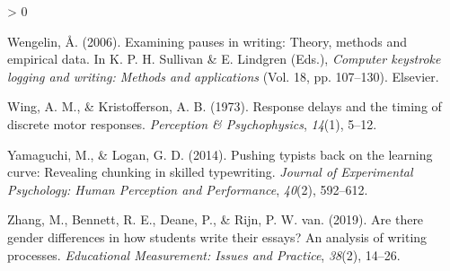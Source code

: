 \documentclass[
  english,
  man,mask,floatsintext]{apa7}
\newlength{\cslhangindent}
\newenvironment{CSLReferences}[2] %
 {%
  \setlength{\parindent}{0pt}
  \ifodd #1 \everypar{\setlength{\hangindent}{\cslhangindent}}\ignorespaces\fi
  \ifnum #2 > 0
  \setlength{\parskip}{#2\baselineskip}
  \fi
 }%
 {}
\begin{document}
\begin{CSLReferences}{1}{0}
\leavevmode\hypertarget{ref-wen06}{}%
Wengelin, Å. (2006). Examining pauses in writing: {T}heory, methods and empirical data. In K. P. H. Sullivan \& E. Lindgren (Eds.), \emph{Computer keystroke logging and writing: Methods and applications} (Vol. 18, pp. 107--130). Elsevier.

\leavevmode\hypertarget{ref-wing1973response}{}%
Wing, A. M., \& Kristofferson, A. B. (1973). Response delays and the timing of discrete motor responses. \emph{Perception \& Psychophysics}, \emph{14}(1), 5--12.

\leavevmode\hypertarget{ref-yamaguchi2014pushing}{}%
Yamaguchi, M., \& Logan, G. D. (2014). Pushing typists back on the learning curve: Revealing chunking in skilled typewriting. \emph{Journal of Experimental Psychology: Human Perception and Performance}, \emph{40}(2), 592--612.

\leavevmode\hypertarget{ref-zhang2019there}{}%
Zhang, M., Bennett, R. E., Deane, P., \& Rijn, P. W. van. (2019). Are there gender differences in how students write their essays? {A}n analysis of writing processes. \emph{Educational Measurement: Issues and Practice}, \emph{38}(2), 14--26.

\end{CSLReferences}
\end{document}
